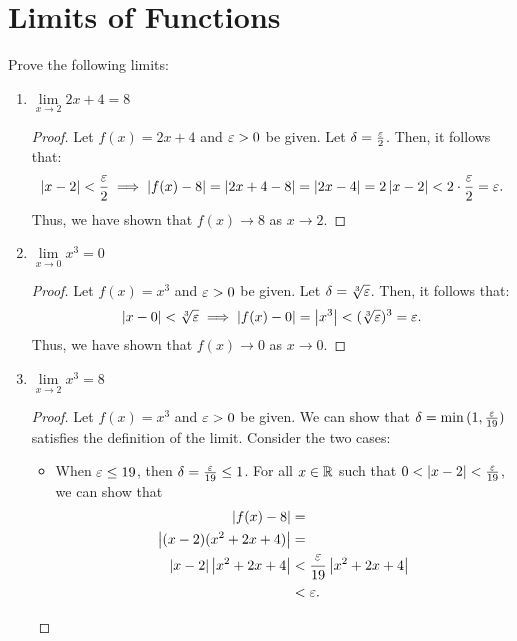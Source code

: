 \section{Limits of Functions}

\begin{problem}
  Prove the following limits:

  \begin{enumerate}[label=(\alph*)]
    \item $\lim\limits_{x \to 2} 2x + 4 = 8$ 
      
      \begin{proof}
        Let $f(x) = 2x + 4$ and $\varepsilon > 0$ be given. Let $\delta = \frac{\varepsilon}{2}$. Then, it follows that: 
        \[
          \left\lvert x - 2 \right\rvert < \frac{\varepsilon}{2} \implies \left\lvert f(x) - 8 \right\rvert = \left\lvert 2x + 4 - 8 \right\rvert = \left\lvert 2x - 4 \right\rvert = 2\left\lvert x - 2 \right\rvert < 2\cdot\frac{\varepsilon}{2} = \varepsilon.
        \]
        Thus, we have shown that $f(x) \to 8$ as $x \to 2$. 
      \end{proof}

    \item $\lim\limits_{x \to 0} x^{3} = 0$ 
      \begin{proof}
        Let $f(x) = x^{3}$ and $\varepsilon > 0$ be given. Let $\delta = \sqrt[3]{\varepsilon}$. Then, it follows that: 
        \[
          \left\lvert x - 0 \right\rvert < \sqrt[3]{\varepsilon} \implies \left\lvert f(x) - 0 \right\rvert = \left\lvert x^{3} \right\rvert < (\sqrt[3]{\varepsilon})^{3} = \varepsilon.
        \]
        Thus, we have shown that $f(x) \to 0$ as $x \to 0$. 
      \end{proof} 

    \item $\lim\limits_{x \to 2} x^{3} = 8$ 
      \begin{proof}
        Let $f(x) = x^{3}$ and $\varepsilon > 0$ be given. We can show that $\delta = \min{(1, \frac{\varepsilon}{19})}$
        satisfies the definition of the limit. Consider the two cases:
        \begin{itemize} 
          \item When $\varepsilon \leq 19$, then $\delta = \frac{\varepsilon}{19} \leq 1$. For all $x \in \mathbb{R}$ 
            such that $0 < \left\lvert x - 2 \right\rvert < \frac{\varepsilon}{19}$, we can show that
              \begin{align*}
                \left\lvert f(x) - 8 \right\rvert &= \\
                \left\lvert (x-2)(x^{2} +2x + 4) \right\rvert &= \\
                \left\lvert x-2 \right\rvert \left\lvert x^{2} + 2x + 4 \right\rvert &< \frac{\varepsilon}{19} \left\lvert x^{2} + 2x + 4 \right\rvert \\ 
                                               &< \varepsilon.
              \end{align*}


\end{itemize}
\end{proof}
\end{enumerate}
\end{problem}
